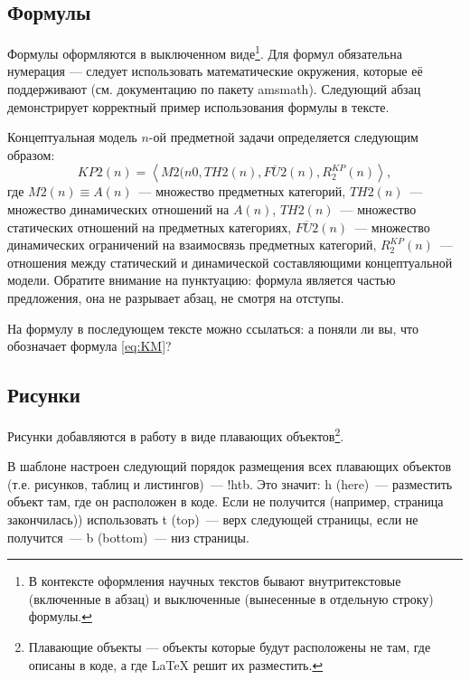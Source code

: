 \subsection{Формулы}

%	

Формулы оформляются в выключенном виде\footnote{В контексте оформления научных текстов бывают внутритекстовые (включенные в абзац) и выключенные (вынесенные в отдельную строку) формулы.}. Для формул обязательна нумерация --- следует использовать математические окружения, которые её поддерживают (см. документацию по пакету amsmath). Следующий абзац  демонстрирует корректный пример использования формулы в тексте.

Концептуальная модель $n$-ой предметной задачи определяется следующим образом:
\begin{equation}\label{eq:KM}
	K\!P2(n) = \left< M2(n0, T\!H2(n), \overline{F\!U2}(n), R^{K\!P}_2(n) \right>,
\end{equation}
где $M2(n)\equiv A(n)$~--- множество предметных категорий, $T\!H2(n)$~--- множество динамических отношений на $A(n)$, $T\!H2(n)$~--- множество статических отношений на предметных категориях, $ \overline{F\!U2}(n)$~--- множество динамических ограничений на взаимосвязь предметных категорий, $ R^{KP}_2(n)$~--- отношения между статический и динамической составляющими концептуальной модели. Обратите внимание на пунктуацию: формула является частью предложения, она не разрывает абзац, не смотря на отступы.

На формулу в последующем тексте можно ссылаться: а поняли ли вы, что обозначает формула \eqref{eq:KM}?

\subsection{Рисунки}

Рисунки добавляются в работу в виде плавающих объектов\footnote{Плавающие объекты --- объекты которые будут расположены не там, где описаны в коде, а где \LaTeX{} решит их разместить.}. 

В шаблоне настроен следующий порядок размещения всех плавающих объектов (т.е. рисунков, таблиц и листингов)~--- !htb. Это значит: h (here)~--- разместить объект там, где он расположен в коде. Если не получится (например, страница закончилась)) использовать t (top)~--- верх следующей страницы, если не получится~--- b (bottom)~--- низ  страницы.

